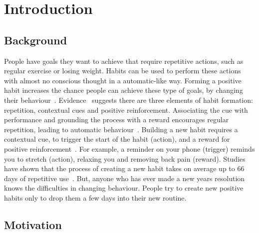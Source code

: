 
\section{Introduction}

\subsection*{Background}
People have goals they want to achieve that require repetitive actions, such as regular exercise or losing weight. Habits can be used to perform these actions with almost no conscious thought in a automatic-like way. Forming a positive habit increases the chance people can achieve these type of goals, by changing their behaviour~\cite{article_promoting_habit_formation}. Evidence~\cite{article_beyond_self_tracking_designing_apps} suggests there are three elements of habit formation: repetition, contextual cues and positive reinforcement. Associating the cue with performance and grounding the process with a reward encourages regular repetition, leading to automatic behaviour~\cite{article_experiences_of_habit_formation}. Building a new habit requires a contextual cue, to trigger the start of the habit (action), and a reward for positive reinforcement~\cite{article_beyond_self_tracking_designing_apps, article_how_habits_formed_modelling_habit_formation}. For example, a reminder on your phone (trigger) reminds you to stretch (action), relaxing you and removing back pain (reward). Studies have shown that the process of creating a new habit takes on average up to 66 days of repetitive use~\cite{article_how_habits_formed_modelling_habit_formation}. But, anyone who has ever made a new years resolution knows the difficulties in changing behaviour. People try to create new positive habits only to drop them a few days into their new routine.

\subsection*{Motivation}

